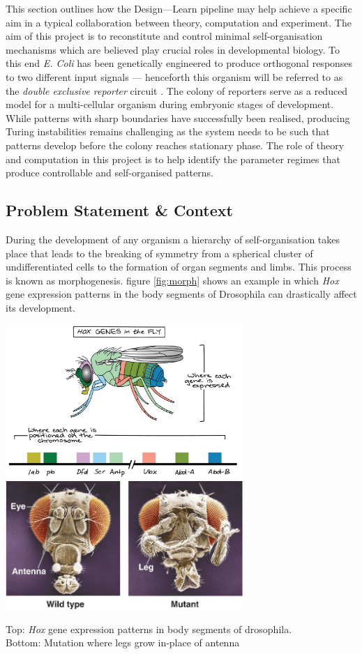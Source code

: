This section outlines how the Design---Learn pipeline may help achieve a specific
aim in a typical collaboration between theory, computation and experiment.
The aim of this project is to reconstitute and control minimal self-organisation
mechanisms which are believed play crucial roles in developmental biology. To this
end \textit{E. Coli} has been genetically engineered to produce orthogonal responses
to two different input signals --- henceforth this organism will be referred to as the
\textit{double exclusive reporter} circuit \cite{Grant2016}. The colony of reporters
serve as a reduced model for a multi-cellular organism during embryonic stages of
development. While patterns with sharp boundaries have successfully been realised,
producing Turing instabilities remains challenging as the system needs to be such
that patterns develop before the colony reaches stationary phase.
The role of theory and computation in this project is to help identify the
parameter regimes that produce controllable and self-organised patterns.

\subsection{Problem Statement \& Context}
During the development of any organism a hierarchy of self-organisation takes place that leads
to the breaking of symmetry from a spherical cluster of undifferentiated cells to the formation
of organ segments and limbs. This process is known as morphogenesis. figure \ref{fig:morph}
shows an example in which \textit{Hox} gene expression patterns in the body segments of
Drosophila can drastically affect its development.

\begin{Figure}
\includegraphics[width=90mm]{figures/morph1.png}\\
\includegraphics[width=90mm]{figures/morph2.png}
\caption{Top: \textit{Hox} gene expression patterns in body segments of drosophila.\\
Bottom: Mutation where legs grow in-place of antenna}
\label{fig:morph}
\end{Figure}
